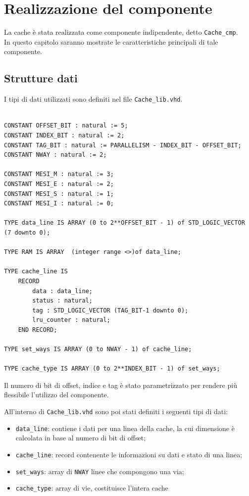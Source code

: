 \clearpage{\pagestyle{empty}\cleardoublepage}

\chapter{Realizzazione del componente}

La cache \`e stata realizzata come componente indipendente, detto \texttt{Cache\_cmp}.\\
In questo capitolo saranno mostrate le caratteristiche principali di tale componente.

\section{Strutture dati}

I tipi di dati utilizzati sono definiti nel file \texttt{Cache\_lib.vhd}.


\begin{lstlisting}

CONSTANT OFFSET_BIT : natural := 5;
CONSTANT INDEX_BIT : natural := 2;
CONSTANT TAG_BIT : natural := PARALLELISM - INDEX_BIT - OFFSET_BIT;
CONSTANT NWAY : natural := 2;

CONSTANT MESI_M : natural := 3;
CONSTANT MESI_E : natural := 2;
CONSTANT MESI_S : natural := 1;
CONSTANT MESI_I : natural := 0;

TYPE data_line IS ARRAY (0 to 2**OFFSET_BIT - 1) of STD_LOGIC_VECTOR (7 downto 0);

TYPE RAM IS ARRAY  (integer range <>)of data_line;

TYPE cache_line IS 
	RECORD
		data : data_line;
		status : natural;
		tag : STD_LOGIC_VECTOR (TAG_BIT-1 downto 0);
		lru_counter : natural;
	END RECORD;

TYPE set_ways IS ARRAY (0 to NWAY - 1) of cache_line;
		
TYPE cache_type IS ARRAY (0 to 2**INDEX_BIT - 1) of set_ways;
\end{lstlisting}


Il numero di bit di offset, indice e tag \`e stato parametrizzato per rendere pi\`u flessibile l'utilizzo del componente.

All'interno di \texttt{Cache\_lib.vhd} sono poi stati definiti i seguenti tipi di dati:
\begin{itemize}
  \item \texttt{data\_line}: contiene i dati per una linea della cache, la cui dimensione \`e calcolata in base al numero di bit di offset;
  \item \texttt{cache\_line}: record contenente le informazioni su dati e stato di una linea;
  \item \texttt{set\_ways}: array di \texttt{NWAY} linee che compongono una via;
  \item \texttt{cache\_type}: array di vie, costituisce l'intera cache
\end{itemize}

